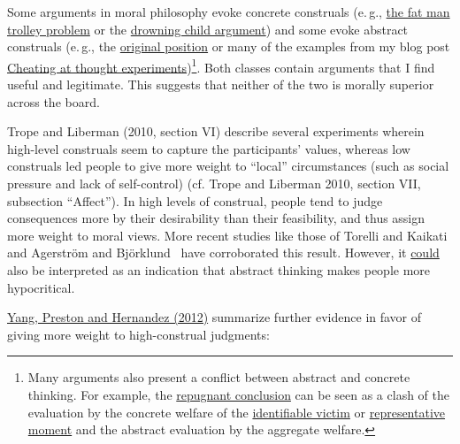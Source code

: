 Some arguments in moral philosophy evoke concrete construals (e.\,g.,
\href{https://en.wikipedia.org/wiki/Trolley_problem\#The_fat_man}{the
fat man trolley problem} or the
\href{https://en.wikipedia.org/wiki/Famine,_Affluence,_and_Morality}{drowning
child argument}) and some evoke abstract construals (e.\,g., the
\href{https://en.wikipedia.org/wiki/Original_position}{original
position} or many of the examples from my blog post
\href{https://casparoesterheld.com/2015/12/06/cheating-at-thought-experiments/}{Cheating
at thought experiments})\footnote{Many arguments also present a
  conflict between abstract and concrete thinking. For example, the
  \href{https://en.wikipedia.org/wiki/Mere_addition_paradox}{repugnant
  conclusion} can be seen as a clash of the evaluation by the concrete
  welfare of the
  \href{https://en.wikipedia.org/wiki/Identifiable_victim_effect}{identifiable
  victim} or
  \href{https://en.wikipedia.org/wiki/Peak\%E2\%80\%93end_rule}{representative
  moment} and the abstract evaluation by the aggregate welfare.}. Both
classes contain arguments that I find useful and legitimate. This
suggests that neither of the two is morally superior across the board.

Trope and Liberman (2010, section VI) describe several experiments
wherein high-level construals seem to capture the participants' values,
whereas low construals led people to give more weight to ``local''
circumstances (such as social pressure and lack of self-control) (cf.
Trope and Liberman 2010, section VII, subsection ``Affect''). In high
levels of construal, people tend to judge consequences more by their
desirability than their feasibility, and thus assign more weight to
moral views. More recent studies like those of Torelli and Kaikati 
\citeyear{Torelli2009-mw} and Agerström and Björklund~
\citeyear{Agerstrom2013-ep} have corroborated this result.
However, it
\href{http://www.overcomingbias.com/2010/05/far-is-hypocritical.html}{could}
also be interpreted as an indication that abstract thinking makes people
more hypocritical.

\href{http://minerva.union.edu/bizerg/readings230/wk04.pdf}{Yang,
Preston and Hernandez (2012)} summarize further evidence in favor of
giving more weight to high-construal judgments:

